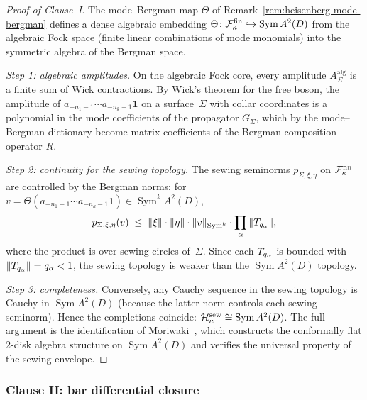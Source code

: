 \begin{proof}[Proof of Clause~I]
The mode--Bergman map $\Theta$ of
Remark~\ref{rem:heisenberg-mode-bergman} defines a dense
algebraic embedding
$\Theta \colon \mathcal{F}_\kappa^{\mathrm{fin}} \hookrightarrow
\operatorname{Sym} A^2(D)$
from the algebraic Fock space (finite linear combinations of
mode monomials) into the symmetric algebra of the Bergman space.

\emph{Step 1: algebraic amplitudes.}
On the algebraic Fock core, every amplitude
$A_\Sigma^{\mathrm{alg}}$ is a finite sum of Wick contractions.
By Wick's theorem for the free boson, the amplitude of
$a_{-n_1-1}\cdots a_{-n_k-1}\mathbf{1}$ on a surface~$\Sigma$
with collar coordinates is a polynomial in the mode
coefficients of the propagator $G_\Sigma$, which by the
mode--Bergman dictionary become matrix coefficients of the
Bergman composition operator $R$.

\emph{Step 2: continuity for the sewing topology.}
The sewing seminorms $p_{\Sigma,\xi,\eta}$ on $\mathcal{F}_\kappa^{\mathrm{fin}}$
are controlled by the Bergman norms: for
$v = \Theta(a_{-n_1-1}\cdots a_{-n_k-1}\mathbf{1})
\in \operatorname{Sym}^k A^2(D)$,
\begin{equation}\label{eq:thqg-X-sewing-seminorm-bound}
p_{\Sigma,\xi,\eta}(v)
\;\leq\;
\|\xi\| \cdot \|\eta\| \cdot \|v\|_{\operatorname{Sym}^k}
\cdot \prod_\alpha \|T_{q_\alpha}\|,
\end{equation}
where the product is over sewing circles of~$\Sigma$.
Since each $T_{q_\alpha}$ is bounded with
$\|T_{q_\alpha}\| = q_\alpha < 1$, the sewing topology is
weaker than the $\operatorname{Sym} A^2(D)$ topology.

\emph{Step 3: completeness.}
Conversely, any Cauchy sequence in the sewing topology is Cauchy
in $\operatorname{Sym} A^2(D)$ (because the latter norm
controls each sewing seminorm). Hence the completions coincide:
$\mathcal{H}_\kappa^{\mathrm{sew}} \cong \operatorname{Sym} A^2(D)$.
The full argument is the identification of Moriwaki~\cite{Moriwaki26b},
which constructs the conformally flat 2-disk algebra structure
on $\operatorname{Sym} A^2(D)$ and verifies the universal
property of the sewing envelope.
\end{proof}

\subsubsection{Clause II: bar differential closure}

